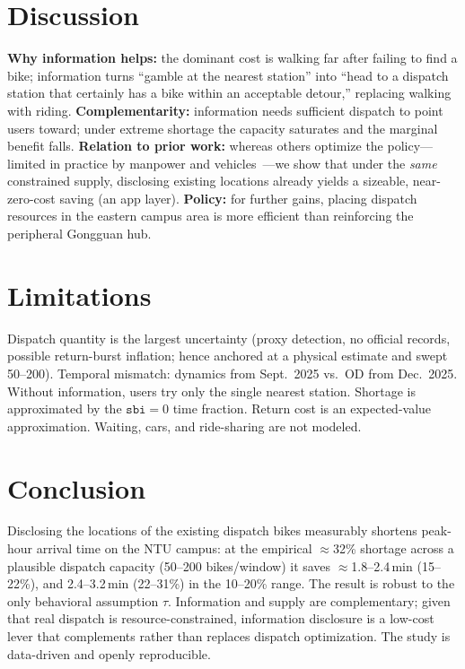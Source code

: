 \documentclass[11pt,a4paper]{article}
\begin{document}
\section{Discussion}
\textbf{Why information helps:} the dominant cost is walking far after failing to find a bike; information turns ``gamble at the
nearest station'' into ``head to a dispatch station that certainly has a bike within an acceptable detour,'' replacing walking
with riding. \textbf{Complementarity:} information needs sufficient dispatch to point users toward; under extreme shortage the
capacity saturates and the marginal benefit falls. \textbf{Relation to prior work:} whereas others optimize the policy---limited
in practice by manpower and vehicles~\cite{su2023}---we show that under the \emph{same} constrained supply, disclosing existing
locations already yields a sizeable, near-zero-cost saving (an app layer). \textbf{Policy:} for further gains, placing dispatch
resources in the eastern campus area is more efficient than reinforcing the peripheral Gongguan hub.

\section{Limitations}
Dispatch quantity is the largest uncertainty (proxy detection, no official records, possible return-burst inflation; hence
anchored at a physical estimate and swept 50--200). Temporal mismatch: dynamics from Sept.\ 2025 vs.\ OD from Dec.\ 2025.
Without information, users try only the single nearest station. Shortage is approximated by the $\texttt{sbi}=0$ time fraction.
Return cost is an expected-value approximation. Waiting, cars, and ride-sharing are not modeled.

\section{Conclusion}
Disclosing the locations of the existing dispatch bikes measurably shortens peak-hour arrival time on the NTU campus: at the
empirical $\approx$32\% shortage across a plausible dispatch capacity (50--200 bikes/window) it saves $\approx$1.8--2.4\,min
(15--22\%), and 2.4--3.2\,min (22--31\%) in the 10--20\% range. The result is robust to the only behavioral assumption $\tau$.
Information and supply are complementary; given that real dispatch is resource-constrained, information disclosure is a low-cost
lever that complements rather than replaces dispatch optimization. The study is data-driven and openly reproducible.
\end{document}
